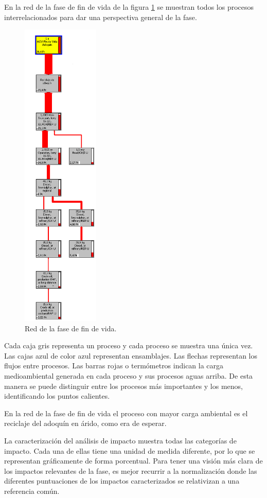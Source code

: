 En la red de la fase de fin de vida de la figura \ref{fig:fdv_red} se muestran todos los procesos interrelacionados para dar una perspectiva general de la fase.

\begin{figure}[!htb]
\centering
\includegraphics[height=15cm]{img/fdv_red.png}
\caption{Red de la fase de fin de vida.}
\label{fig:fdv_red}
\end{figure}

Cada caja gris representa un proceso y cada proceso se muestra una única vez. Las cajas azul de color azul representan ensamblajes. Las flechas representan los flujos entre procesos. Las barras rojas o termómetros indican la carga medioambiental generada en cada proceso y sus procesos aguas arriba. De esta manera se puede distinguir entre los procesos más importantes y los menos, identificando los puntos calientes.

En la red de la fase de fin de vida el proceso con mayor carga ambiental es el reciclaje del adoquín en árido, como era de esperar.

La caracterización del análisis de impacto muestra todas las categorías de impacto. Cada una de ellas tiene una unidad de medida diferente, por lo que se representan gráficamente de forma porcentual. Para tener una visión más clara de los impactos relevantes de la fase, es mejor recurrir a la normalización donde las diferentes puntuaciones de los impactos caracterizados se relativizan a una referencia común.

